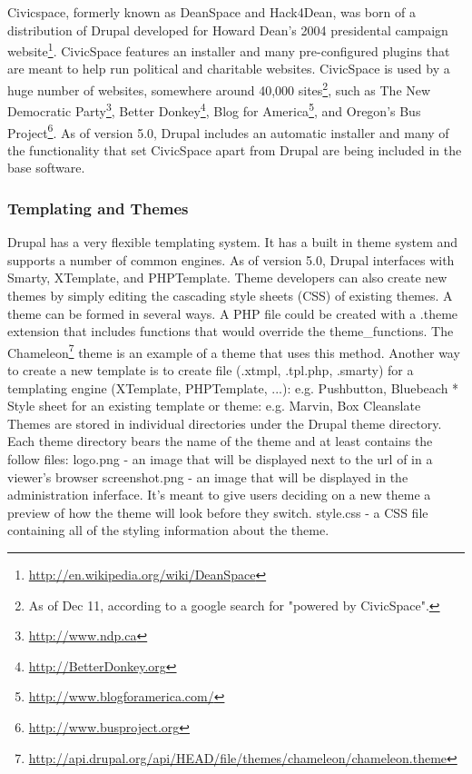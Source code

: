\documentclass[a4paper,12pt]{report}
\begin{document}
Civicspace, formerly known as DeanSpace and Hack4Dean, was born of a distribution of Drupal developed for Howard Dean's 2004 presidental campaign website\footnote{\url{ http://en.wikipedia.org/wiki/DeanSpace}}.
CivicSpace features an installer and many pre-configured plugins that are meant to help run political and charitable websites.
CivicSpace is used by a huge number of websites, somewhere around 40,000 sites\footnote{As of Dec 11, according to a google search for "powered by CivicSpace".}, such as The New Democratic Party\footnote{\url{ http://www.ndp.ca}}, Better Donkey\footnote{\url{http://BetterDonkey.org}}, Blog for America\footnote{\url{ http://www.blogforamerica.com/}}, and Oregon's Bus Project\footnote{\url{http://www.busproject.org}}.
As of version 5.0, Drupal includes an automatic installer and many of the functionality that set CivicSpace apart from Drupal are being included in the base software.

\subsubsection {Templating and Themes}
Drupal has a very flexible templating system. 
It has a built in theme system and supports a number of common engines. 
As of version 5.0, Drupal interfaces with Smarty, XTemplate, and PHPTemplate. 
Theme developers can also create new themes by simply editing the cascading style sheets (CSS) of existing themes. 
A theme can be formed in several ways. A PHP file could be created with a .theme extension that includes functions that would override the theme_functions. The Chameleon\footnote{\url{http://api.drupal.org/api/HEAD/file/themes/chameleon/chameleon.theme}} theme is an example of a theme that uses this method. Another way to create a new template is to create file (.xtmpl, .tpl.php, .smarty) for a templating engine (XTemplate, PHPTemplate, ...): e.g. Pushbutton, Bluebeach
* Style sheet for an existing template or theme: e.g. Marvin, Box Cleanslate
Themes are stored in individual directories under the Drupal theme directory. 
Each theme directory bears the name of the theme and at least contains the follow files:
logo.png - an image that will be displayed next to the url of in a viewer's browser
screenshot.png - an image that will be displayed in the administration inferface. It's meant to give users deciding on a new theme a preview of how the theme will look before they switch.
style.css - a CSS file containing all of the styling information about the theme.
\end{document}
